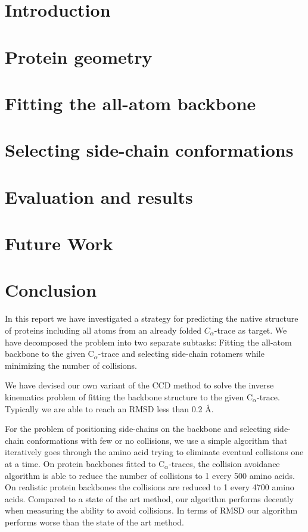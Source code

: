 \documentclass[10pt,a4paper,final,oneside,openany,article,twocolumn]{memoir}
\newcommand{\Ca}{C$_{\alpha}${}}
\begin{document}

\newpage
\chapter{Introduction}
\label{chap:intro}


\chapter{Protein geometry}
\label{chap:protein_geometry}


\chapter{Fitting the all-atom backbone}
\label{chap:fitting_backbone}


\chapter{Selecting side-chain conformations}
\label{chap:handling_sidechains}


\chapter{Evaluation and results}


\chapter{Future Work}


\chapter{Conclusion}
In this report we have investigated a strategy for predicting the native structure of proteins including all atoms from an already folded $C_\alpha$-trace as target. 
We have decomposed the problem into two separate subtasks:
Fitting the all-atom backbone to the given \Ca-trace and selecting side-chain rotamers while minimizing the number of collisions.

We have devised our own variant of the CCD method to solve the inverse kinematics problem of fitting the backbone structure to the given \Ca-trace. 
Typically we are able to reach an RMSD less than 0.2 Å.

For the problem of positioning side-chains on the backbone and
selecting side-chain conformations with few or no collisions, we use
a simple algorithm that iteratively goes through the amino acid trying
to eliminate eventual collisions one at a time. 
On protein backbones fitted to \Ca-traces, the collision avoidance algorithm is able to reduce the number of collisions to 1 every 500 amino acids.
On realistic protein backbones the collisions are reduced to 1 every 4700 amino acids.
Compared to a state of the art method, our algorithm performs decently when measuring the ability to avoid collisions.
In terms of RMSD our algorithm performs worse than the state of the art method.
\end{document}

